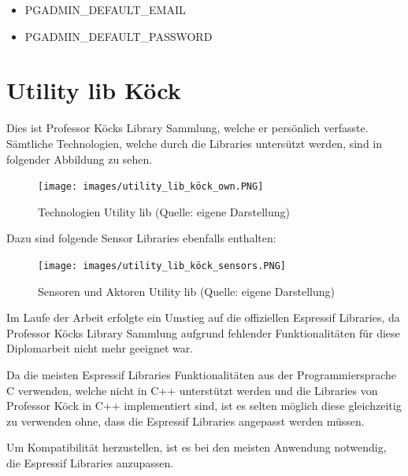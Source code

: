 \begin{itemize}
    \item PGADMIN\_DEFAULT\_EMAIL
    \item PGADMIN\_DEFAULT\_PASSWORD
\end{itemize}

\pagebreak

\section{Utility lib Köck}\label{sec:utility-lib-koeck}
Dies ist Professor Köcks Library Sammlung, welche er persönlich verfasste. Sämtliche Technologien, welche durch die Libraries untersützt werden, sind in folgender Abbildung zu sehen.

\begin{figure}[H]
    \begin{center}
        \texttt{[image: images/utility\_lib\_köck\_own.PNG]}
        \caption{Technologien Utility lib (Quelle: eigene Darstellung)}
    \end{center}
\end{figure}

\pagebreak
Dazu sind folgende Sensor Libraries ebenfalls enthalten:

\begin{figure}[H]
    \begin{center}
        \texttt{[image: images/utility\_lib\_köck\_sensors.PNG]}
        \caption{Sensoren und Aktoren Utility lib (Quelle: eigene Darstellung)}
    \end{center}
\end{figure}

Im Laufe der Arbeit erfolgte ein Umstieg auf die offiziellen Espressif Libraries, da Professor Köcks Library Sammlung aufgrund fehlender Funktionalitäten für diese Diplomarbeit nicht mehr geeignet war.

Da die meisten Espressif Libraries Funktionalitäten aus der Programmiersprache C verwenden, welche nicht in C++ unterstützt werden und die Libraries von Professor Köck in C++ implementiert sind, ist es selten möglich diese gleichzeitig zu verwenden ohne, dass die Espressif Libraries angepasst werden müssen.

Um Kompatibilität herzustellen, ist es bei den meisten Anwendung notwendig, die Espressif Libraries anzupassen.